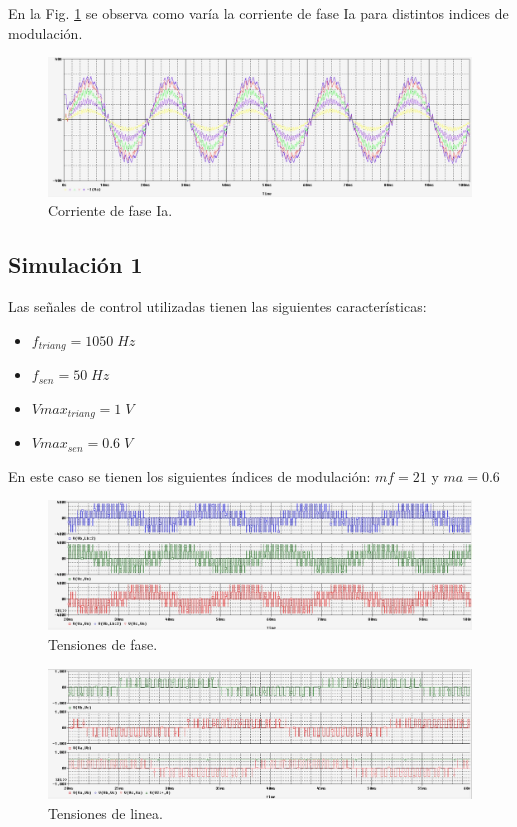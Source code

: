\documentclass[11pt, a4paper]{article}
\begin{document}
\newpage

En la Fig. \ref{fig:Iama} se observa como varía la corriente de fase Ia para distintos indices de modulación.

\begin{figure}[h!]
	\centering
	\includegraphics[width=15cm]{primer/Ifase}
	\caption{Corriente de fase Ia.}
	\label{fig:Iama}
\end{figure}

\subsection{Simulación 1}
Las señales de control utilizadas tienen las siguientes características: 
\begin{itemize}
\item $f_{triang} = 1050 \; Hz$
\item $f_{sen} = 50 \; Hz$
\item $Vmax_{triang} = 1 \;V$
\item $Vmax_{sen} = 0.6 \; V$
\end{itemize}
En este caso se tienen los siguientes índices de modulación: $mf = 21$ y $ma = 0.6$


\begin{figure}[h!]
\centering
\includegraphics[width=15cm]{primer/V_Fase1mejor}
\caption{Tensiones de fase.}
\label{fig:Vfase21}
\end{figure}

\begin{figure}[h!]
\centering
\includegraphics[width=15cm]{primer/V_Linea}
\caption{Tensiones de linea.}
\label{fig:Vlinea21}
\end{figure}
\end{document}
